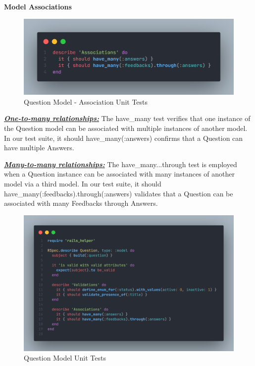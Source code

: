 \begin{justify}
\clearpage
\vspace{0.25cm}
\newendline
\textbf{Model Associations}

    \begin{figure}[H]
        \centerline{\includegraphics[width=140mm,scale=1]{figures/implementation_and_testing/testing/AUT/question/associations.png}}
        \caption{Question Model - Association Unit Tests}
        \label{Question Model - Association Unit Tests}
    \end{figure}

\vspace{0.25cm}
\noindent\textbf{\textit{\underline{One-to-many relationships:}}} The have\_many test verifies that one instance of the Question model can be associated with multiple instances of another model. In our test suite, it { should have\_many(:answers) } confirms that a Question can have multiple Answers.

\vspace{0.25cm}
\noindent\textbf{\textit{\underline{Many-to-many relationships:}}} The have\_many...through test is employed when a Question instance can be associated with many instances of another model via a third model. In our test suite, it { should have\_many(:feedbacks).through(:answers) } validates that a Question can be associated with many Feedbacks through Answers.

    \begin{figure}[H]
        \centerline{\includegraphics[width=130mm,scale=1]{figures/implementation_and_testing/testing/AUT/question/all.png}}
        \caption{Question Model Unit Tests}
        \label{Question Model Unit Tests}
    \end{figure}


\end{justify}
